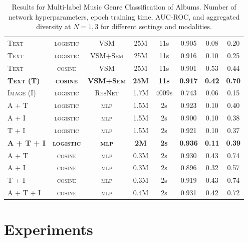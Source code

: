 \begin{table}[ht]
\begin{tabular}{lccccccc}
\midrule
\textsc{Text} & \textsc{logistic} & \textsc{VSM} & 25M & 11s & 0.905 & 0.08 & 0.20 \\
\textsc{Text} & \textsc{logistic} & \textsc{VSM+Sem} & 25M & 11s & 0.916 & 0.10 & 0.25 \\
\textsc{Text} & \textsc{cosine} & \textsc{VSM} & 25M & 11s & 0.901 & 0.53 & 0.44 \\
\textbf{\textsc{Text (T)}} & \textbf{\textsc{cosine}} & \textbf{\textsc{VSM+Sem}} & \textbf{25M} & \textbf{11s} & \textbf{0.917} & \textbf{0.42} & \textbf{0.70} \\
\midrule
\textsc{Image (I)} & \textsc{logistic} & \textsc{ResNet} & 1.7M & 4009s & 0.743 & 0.06 & 0.15 \\
\midrule
\textsc{A + T} & \textsc{logistic} & \textsc{mlp} & 1.5M & 2s & 0.923 & 0.10 & 0.40 \\
\textsc{A + I} & \textsc{logistic} & \textsc{mlp} & 1.5M & 2s & 0.900 & 0.10 & 0.38 \\
\textsc{T + I} & \textsc{logistic} & \textsc{mlp} & 1.5M & 2s & 0.921 & 0.10 & 0.37 \\
\textbf{\textsc{A + T + I}} & \textbf{\textsc{logistic}} & \textbf{\textsc{mlp}} & \textbf{2M} & \textbf{2s} & \textbf{0.936} & \textbf{0.11} & \textbf{0.39} \\
\textsc{A + T} & \textsc{cosine} & \textsc{mlp} & 0.3M & 2s & 0.930 & 0.43 & 0.74 \\
\textsc{A + I} & \textsc{cosine} & \textsc{mlp} & 0.3M & 2s & 0.896 & 0.32 & 0.57 \\
\textsc{T + I} & \textsc{cosine} & \textsc{mlp} & 0.3M & 2s & 0.919 & 0.43 & 0.74 \\
\textsc{A + T + I} & \textsc{cosine} & \textsc{mlp} & 0.4M & 2s & 0.931 & 0.42 & 0.72 \\
\bottomrule
\end{tabular}
\caption[Results for Multi-label Music Genre Classification of Albums.]{Results for Multi-label Music Genre Classification of Albums. Number of network hyperparameters, epoch training time, AUC-ROC, and aggregated diversity at $N = 1,3$ for different settings and modalities.}
\end{table}

\section{Experiments}\label{sec:multi-class:experiments}

